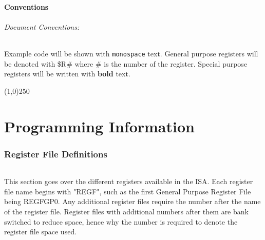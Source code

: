 \documentclass[letterpaper, 11pt]{article}
\begin{document}
\subsection{Conventions}
\paragraph{Document Conventions:}Example code will be shown with \texttt{monospace} text. General purpose registers will be denoted with
\$R\# where \# is the number of the register. Special purpose registers will be written with \textbf{bold} text.
\begin{center}
	\line(1,0){250}
\end{center}
\clearpage
\part{Programming Information}
\section{Register File Definitions}
\paragraph{}This section goes over the different registers available in the ISA. Each register file name begins with 
"REGF", such as the first General Purpose Register File being REGFGP0. Any additional register files require the number after the
name of the register file. Register files with additional numbers after them are bank switched to reduce space, hence why the number is
required to denote the register file space used.
\clearpage
\end{document}
